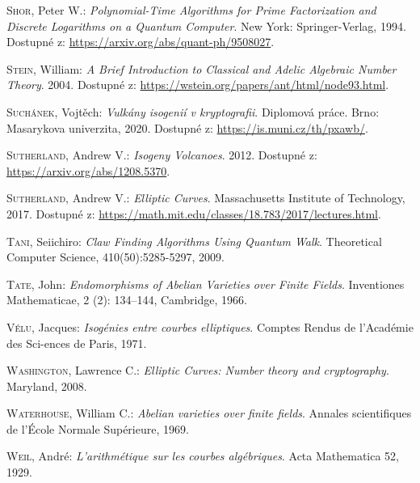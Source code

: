 \documentclass[12pt]{report}
\begin{document}
\begin{thebibliography}{97}
\textsc{Shor}, Peter W.: \textit{Polynomial-Time Algorithms for Prime Factorization and Discrete Logarithms on a Quantum Computer}. New York: Springer-Verlag, 1994. Dostupné z: \url{https://arxiv.org/abs/quant-ph/9508027}.

\textsc{Stein}, William: \textit{A Brief Introduction to Classical and Adelic Algebraic Number Theory}. 2004. Dostupné z: \url{https://wstein.org/papers/ant/html/node93.html}.


\textsc{Suchánek}, Vojtěch: \textit{Vulkány isogenií v kryptografii}. Diplomová práce. Brno: Masarykova univerzita, 2020. Dostupné z: \url{https://is.muni.cz/th/pxawb/}.

\textsc{Sutherland}, Andrew V.: \textit{Isogeny Volcanoes}. 2012. Dostupné z: \url{https://arxiv.org/abs/1208.5370}.

\textsc{Sutherland}, Andrew V.: \textit{Elliptic Curves}. Massachusetts Institute of Technology, 2017. Dostupné z: \url{https://math.mit.edu/classes/18.783/2017/lectures.html}. 

\textsc{Tani}, Seiichiro: \textit{Claw Finding Algorithms Using Quantum Walk}. Theoretical Computer Science, 410(50):5285-5297, 2009.

\textsc{Tate}, John: \textit{Endomorphisms of Abelian Varieties over Finite Fields}. Inventiones Mathematicae, 2 (2): 134–144, Cambridge, 1966.

\textsc{Vélu}, Jacques: \textit{Isogénies entre courbes elliptiques}. Comptes Rendus de l’Académie des Sci-ences de Paris, 1971. 

\textsc{Washington}, Lawrence C.: \textit{Elliptic Curves: Number theory and cryptography}. Maryland, 2008. 

\textsc{Waterhouse}, William C.: \textit{Abelian varieties over finite fields}. Annales scientifiques de l’École Normale Supérieure, 1969.

\textsc{Weil}, André: \textit{L'arithmétique sur les courbes algébriques}.  Acta Mathematica 52, 1929. 


\end{thebibliography}
\end{document}
